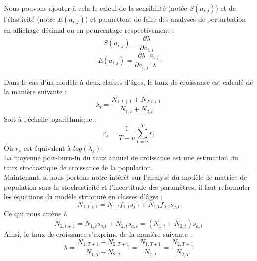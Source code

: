 \documentclass[12pt,a4paper]{article}
\begin{document}
Nous pouvons ajouter à cela le calcul de la sensibilité (notée $S(a_{i, j})$) et de l'élasticité (notée $E(a_{i, j})$) et permettent de faire des analyses de perturbation en affichage décimal ou en pourcentage respectivement :
\begin{equation}
S(a_{i, j})=\dfrac{\partial\lambda}{\partial a_{i, j}}
\end{equation}
\begin{equation}
E(a_{i, j})=\dfrac{\partial\lambda}{\partial a_{i, j}} \dfrac{a_{i, j}}{\lambda}
\end{equation}

Dans le cas d'un modèle à deux classes d'âges, le taux de croissance est calculé de la manière suivante : 
\begin{equation}
\lambda_{t}=\dfrac{N_{1, t+1}+N_{2, t+1}}{N_{1, t}+N_{2, t}}
\end{equation}
Soit à l'échelle logarithmique :
\begin{equation}
r_{s}=\dfrac{1}{T-u}\sum_{t=u}^{T}r_t
\end{equation}
Où $r_s$ est équivalent à $log(\lambda_s)$.\\La moyenne post-burn-in du taux annuel de croissance est une estimation du taux stochastique de croissance de la population.  
\\
Maintenant, si nous portons notre intérêt sur l'analyse du modèle de matrice de population sans la stochasticité et l'incertitude des paramètres, il faut reformuler les équations du modèle structuré en classes d'âges :
\begin{equation}
N_{1, t+1}=N_{1, t}f_{1, t}s_{j, t}+N_{2, t}f_{a, t}s_{j, t}
\end{equation}
Ce qui nous amène à 
\begin{equation}
N_{2, t+1}=N_{1, t}s_{a, t}+N_{2, t}s_{a, t}=(N_{1, t}+N_{2, t})s_{a, t}
\end{equation}
Ainsi, le taux de croissance s'exprime de la manière suivante :
\begin{equation}
\lambda=\dfrac{N_{1, T+1}+N_{2, T+1}}{N_{1, T}+N_{2, T}}=\dfrac{N_{1, T+1}}{N_{1, T}}=\dfrac{N_{2, T+1}}{N_{2, T}}
\end{equation}
\end{document}
